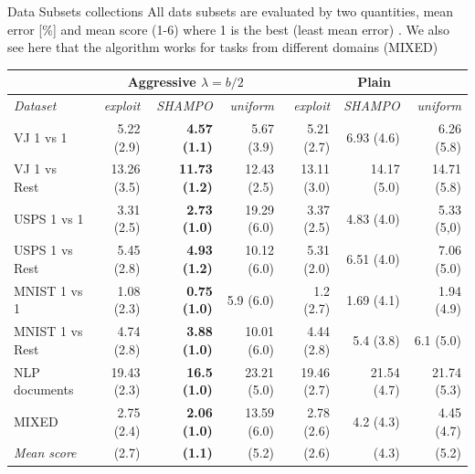 \documentclass{beamer}
\begin{document}
\begin{frame}{Data Subsets collections}
All dats subsets are evaluated by two quantities, mean error [\%] 
and mean score (1-6) where 1 is the best (least mean error) .\newline
We also see here that the algorithm works for tasks from different domains (MIXED)
 \begin{table}[h] 
\begin{centering}
{\tiny	
\begin{tabular}{|l|r|r|r|r|r|r|}
\hline
                         & \multicolumn{3}{c|}{\textbf{Aggressive $\lambda=b/2$}}               & \multicolumn{3}{c|}{\textbf{Plain}}                 \\ \hline
\textit{Dataset}         & \textit{exploit} & \textit{SHAMPO}         & \textit{uniform} & \textit{exploit} & \textit{SHAMPO} & \textit{uniform} \\ \hline
{VJ 1 vs 1 }        & 5.22 (2.9)       & \textbf{4.57 (1.1)}   & 5.67 (3.9)       & 5.21 (2.7)       & 6.93 (4.6)    & 6.26 (5.8)       \\
\textrm{VJ 1 vs Rest}    & 13.26 (3.5)      & \textbf{11.73 (1.2)} & 12.43 (2.5)      & 13.11 (3.0)        & 14.17 (5.0)     & 14.71 (5.8)     \\
\textrm{USPS 1 vs 1}      & 3.31 (2.5)       & \textbf{2.73 (1.0)}     & 19.29 (6.0)        & 3.37 (2.5)       & 4.83 (4.0)      & 5.33 (5,0)         \\
\textrm{USPS 1 vs Rest}  & 5.45 (2.8)      & \textbf{4.93 (1.2)}  & 10.12 (6.0)        & 5.31 (2.0)         & 6.51 (4.0)      & 7.06 (5.0)         \\
\textrm{MNIST 1 vs 1}     & 1.08 (2.3)       & \textbf{0.75 (1.0)}     & 5.9 (6.0)         & 1.2 (2.7)       & 1.69 (4.1)      & 1.94 (4.9)     \\
\textrm{MNIST 1 vs Rest} & 4.74 (2.8)      & \textbf{3.88 (1.0)}     & 10.01 (6.0)       & 4.44 (2.8)      & 5.4 (3.8)    & 6.1 (5.0)          \\
\textrm{NLP documents} & 19.43 (2.3)     & \textbf{16.5 (1.0)}     & 23.21 (5.0)        & 19.46 (2.7)     & 21.54 (4.7)  & 21.74 (5.3)     \\
\textrm{MIXED}           & 2.75 (2.4)       & \textbf{2.06 (1.0)}     & 13.59 (6.0)        & 2.78 (2.6)       & 4.2 (4.3)     & 4.45 (4.7)       \\ \hline
\textit{Mean score}      & (2.7)           & \textbf{(1.1)}       & (5.2)           & (2.6)           & (4.3)        & (5.2)           \\ \hline
\end{tabular}
}
\end{centering}
\end{table}
\end{frame}
\end{document}
